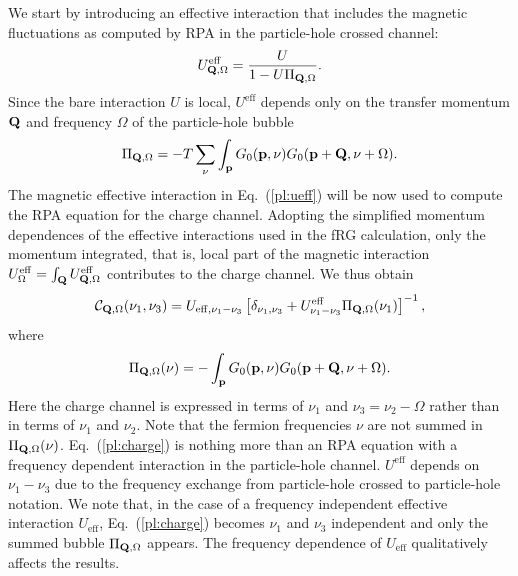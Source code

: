 We start by introducing an effective interaction that includes the magnetic fluctuations as computed by RPA \cite{Rohringer2012} in the particle-hole crossed channel:
\begin{equation}
 U^{\mathrm{eff}}_{\mathbf{Q},\Omega} = \frac{U}{1 - U \Pi_{\mathbf{Q},\Omega}}.
\label{pl:ueff}
\end{equation}
Since the bare interaction $U$ is local, $U^{\mathrm{eff}}$ depends only on the transfer momentum $\mathbf{Q}$ and frequency $\Omega$ of the particle-hole bubble
\begin{equation}
 \Pi_{\mathbf{Q},\Omega} =
 - T \sum_{\nu} \int_{\mathbf{p}} G_0(\mathbf{p},\nu) G_0(\mathbf{p}+\mathbf{Q},\nu+\Omega).
\end{equation}
The magnetic effective interaction in Eq.~(\ref{pl:ueff}) will be now used to compute the RPA equation for the charge channel. Adopting the simplified momentum dependences of the effective interactions used in the fRG calculation, only the momentum integrated, that is, local part of the magnetic interaction
$U^{\mathrm{eff}}_{\Omega} = \int_{\mathbf{Q}} U^{\mathrm{eff}}_{\mathbf{Q},\Omega}$
contributes to the charge channel. We thus obtain
\begin{equation}
\mathcal{C}_{\mathbf{Q},\Omega} (\nu_1,\nu_3) = U_{\mathrm{eff},\nu_1-\nu_3} \left[ \delta_{\nu_1,\nu_3} + U^{\mathrm{eff}}_{\nu_1-\nu_3} \Pi_{\mathbf{Q},\Omega}(\nu_1) \right]^{-1} ,
\label{pl:charge}
\end{equation}
where
\begin{equation}
 \Pi_{\mathbf{Q},\Omega}(\nu) =
 - \int_{\mathbf{p}} G_0(\mathbf{p},\nu) G_0(\mathbf{p}+\mathbf{Q},\nu+\Omega) .
\end{equation}
Here the charge channel is expressed in terms of $\nu_1$ and $\nu_3=\nu_2-\Omega$ rather than in terms of $\nu_1$ and $\nu_2$. Note that the fermion frequencies $\nu$ are not summed in $\Pi_{\mathbf{Q},\Omega}(\nu)$.
Eq.~(\ref{pl:charge}) is nothing more than an RPA equation with a frequency dependent interaction in the particle-hole channel.\cite{Rohringer2012} $U^{\mathrm{eff}}$ depends on $\nu_1-\nu_3$ due to the frequency exchange from particle-hole crossed to particle-hole notation.
We note that, in the case of a frequency independent effective interaction $U_{\mathrm{eff}}$, Eq.~(\ref{pl:charge}) becomes $\nu_1$ and $\nu_3$ independent 
and only the summed bubble $\Pi_{\mathbf{Q},\Omega}$ appears.
The frequency dependence of $U_{\mathrm{eff}}$ qualitatively affects the results. 

